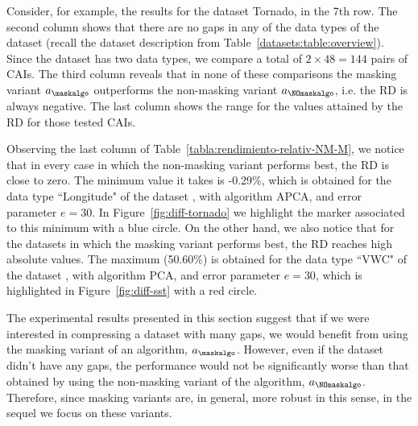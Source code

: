 Consider, for example, the results for the dataset Tornado, in the 7th row. The second column shows that there are no gaps in any of the data types of the dataset (recall the dataset description from Table~\ref{datasets:table:overview}). Since the dataset has two data types, we compare a total of $2\times48=144$ pairs of CAIs. The third column reveals that in none of these comparisons the masking variant $a_\maskalgo$ outperforms the non-masking variant $a_\NOmaskalgo$, i.e. the RD is always negative. The last column shows the range for the values attained by the RD for those tested CAIs.


Observing the last column of Table~\ref{tabla:rendimiento-relativ-NM-M}, we notice that in every case in which the non-masking variant performs best, the RD is close to zero. The minimum value it takes is -0.29\%, which is obtained for the data type ``Longitude" of the dataset \datasettornado, with algorithm APCA, and error parameter $e=30$. In Figure~\ref{fig:diff-tornado} we highlight the marker associated to this minimum with a blue circle. On the other hand, we also notice that for the datasets in which the masking variant performs best, the RD reaches high absolute values. The maximum (50.60\%) is obtained for the data type ``VWC" of the dataset \datasetsst, with algorithm PCA, and error parameter $e=30$, which is highlighted in Figure~\ref{fig:diff-sst} with a red circle.


The experimental results presented in this section suggest that if we were interested in compressing a dataset with many gaps, we would benefit from using the masking variant of an algorithm, $a_\maskalgo$. However, even if the dataset didn't have any gaps, the performance would not be significantly worse than that obtained by using the non-masking variant of the algorithm, $a_\NOmaskalgo$. Therefore, since masking variants are, in general, more robust in this sense, in the sequel we focus on these variants.

